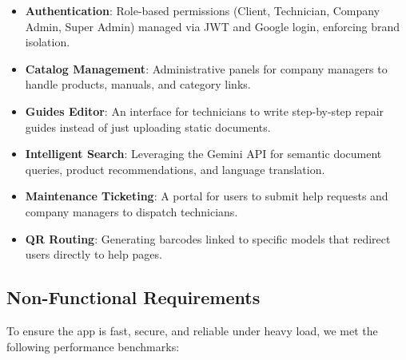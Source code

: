 \documentclass[12pt,a4paper]{report}
\begin{document}
\begin{itemize}
    \item \textbf{Authentication}: Role-based permissions (Client, Technician, Company Admin, Super Admin) managed via JWT and Google login, enforcing brand isolation.
    \item \textbf{Catalog Management}: Administrative panels for company managers to handle products, manuals, and category links.
    \item \textbf{Guides Editor}: An interface for technicians to write step-by-step repair guides instead of just uploading static documents.
    \item \textbf{Intelligent Search}: Leveraging the Gemini API \cite{gemini} for semantic document queries, product recommendations, and language translation.
    \item \textbf{Maintenance Ticketing}: A portal for users to submit help requests and company managers to dispatch technicians.
    \item \textbf{QR Routing}: Generating barcodes linked to specific models that redirect users directly to help pages.
\end{itemize}

\subsection{Non-Functional Requirements}

To ensure the app is fast, secure, and reliable under heavy load, we met the following performance benchmarks:
\end{document}
